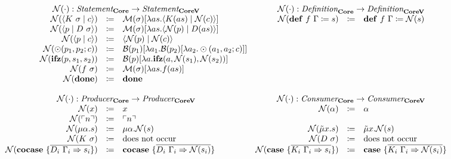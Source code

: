 \begin{gather*}
  \begin{array}{rclrcl}
    \multicolumn{3}{c}{\name{\cdot} : \emph{Statement}_{\targetlang{}} \rightarrow \emph{Statement}_{\targetvar{}}} &
    \multicolumn{3}{c}{\name{\cdot} : \emph{Definition}_{\targetlang{}} \rightarrow \emph{Definition}_{\targetvar{}}} \\
    \name{\cut{K\ \sigma}{c}} & \coloneq & \binds{\sigma}{\lambda as.\cut{K(as)}{\name{c}}} &
    \name{\defi{f\ \Gamma}{s}} & \coloneq & \defi{f\ \Gamma}{\name{s}} \\
    \name{\cut{p}{D\ \sigma}} & \coloneq & \binds{\sigma}{\lambda as.\cut{\name{p}}{D(as)}} \\
    \name{\cut{p}{c}} & \coloneq & \cut{\name{p}}{\name{c}} \\
    \name{\odot(p_1, p_2; c)}{} & \coloneq & \bind{p_1}{\lambda a_1.\bind{p_2}{\lambda a_2.\odot(a_1, a_2; c)}} \\
    \name{\ifz{p}{s_1}{s_2}}{} & \coloneq & \bind{p}{\lambda a.\ifz{a}{\name{s_1}}{\name{s_2}}} \\
    \name{f\ \sigma}{} & \coloneq & \binds{\sigma}{\lambda as.f(as)} \\
    \name{\done}{} & \coloneq & \done \\
    \\
    \multicolumn{3}{c}{\name{\cdot} : \emph{Producer}_{\targetlang{}} \rightarrow \emph{Producer}_{\targetvar{}}} &
    \multicolumn{3}{c}{\name{\cdot} : \emph{Consumer}_{\targetlang{}} \rightarrow \emph{Consumer}_{\targetvar{}}} \\
    \name{x} & \coloneq & x &
    \name{\alpha} & \coloneq & \alpha \\
    \name{\lit{n}} & \coloneq & \lit{n} & & & \\
    \name{\mu\alpha.s} & \coloneq & \mu\alpha.\name{s} &
    \name{\tilde{\mu}x.s} & \coloneq & \tilde{\mu}x.\name{s} \\
    \name{K\ \sigma} & \coloneq & \text{does not occur} &
    \name{D\ \sigma} & \coloneq & \text{does not occur} \\
    \name{\cocase{\overline{D_i\ \Gamma_i \Rightarrow s_i}}} & \coloneq & \cocase{\overline{D_i\ \Gamma_i \Rightarrow \name{s_i}}} &
    \name{\case{\overline{K_i\ \Gamma_i \Rightarrow s_i}}} & \coloneq & \case{\overline{K_i\ \Gamma_i \Rightarrow \name{s_i}}} \\
  \end{array}
  \\\\

\end{gather*}
